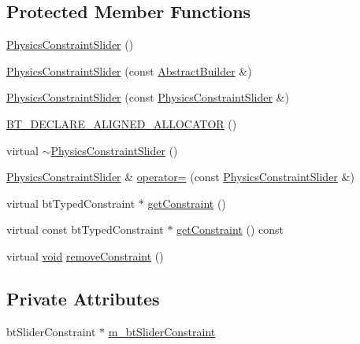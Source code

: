 \subsection*{Protected Member Functions}
\begin{DoxyCompactItemize}
\item 
\mbox{\hyperlink{classnjli_1_1_physics_constraint_slider_a616ab8c83dfe01a481394ff21db39fde}{Physics\+Constraint\+Slider}} ()
\item 
\mbox{\hyperlink{classnjli_1_1_physics_constraint_slider_a3ce0e8d15d15fa8e39503be30a9aade9}{Physics\+Constraint\+Slider}} (const \mbox{\hyperlink{classnjli_1_1_abstract_builder}{Abstract\+Builder}} \&)
\item 
\mbox{\hyperlink{classnjli_1_1_physics_constraint_slider_a836a6d7a6b5fe8ff58631b750d867d4f}{Physics\+Constraint\+Slider}} (const \mbox{\hyperlink{classnjli_1_1_physics_constraint_slider}{Physics\+Constraint\+Slider}} \&)
\item 
\mbox{\hyperlink{classnjli_1_1_physics_constraint_slider_acb06c17a06f8ae0163d564df18f9a05c}{B\+T\+\_\+\+D\+E\+C\+L\+A\+R\+E\+\_\+\+A\+L\+I\+G\+N\+E\+D\+\_\+\+A\+L\+L\+O\+C\+A\+T\+OR}} ()
\item 
virtual \mbox{\hyperlink{classnjli_1_1_physics_constraint_slider_a44b68eacf15e6f719fdc1a94f4b4ecb8}{$\sim$\+Physics\+Constraint\+Slider}} ()
\item 
\mbox{\hyperlink{classnjli_1_1_physics_constraint_slider}{Physics\+Constraint\+Slider}} \& \mbox{\hyperlink{classnjli_1_1_physics_constraint_slider_aa46415916ed15e9cc1d2307c48ebc8fb}{operator=}} (const \mbox{\hyperlink{classnjli_1_1_physics_constraint_slider}{Physics\+Constraint\+Slider}} \&)
\item 
virtual bt\+Typed\+Constraint $\ast$ \mbox{\hyperlink{classnjli_1_1_physics_constraint_slider_a0de9fb59fa29e7e1766c6e0e02ef37e3}{get\+Constraint}} ()
\item 
virtual const bt\+Typed\+Constraint $\ast$ \mbox{\hyperlink{classnjli_1_1_physics_constraint_slider_aff5bac3b1c256860d6f8214d64ca8a61}{get\+Constraint}} () const
\item 
virtual \mbox{\hyperlink{_thread_8h_af1e856da2e658414cb2456cb6f7ebc66}{void}} \mbox{\hyperlink{classnjli_1_1_physics_constraint_slider_a86bb3a2cb9397577d6f4003c1ff9a2b2}{remove\+Constraint}} ()
\end{DoxyCompactItemize}
\subsection*{Private Attributes}
\begin{DoxyCompactItemize}
\item 
bt\+Slider\+Constraint $\ast$ \mbox{\hyperlink{classnjli_1_1_physics_constraint_slider_abeac39c96abf6541fba28c9630f3edd6}{m\+\_\+bt\+Slider\+Constraint}}
\end{DoxyCompactItemize}
